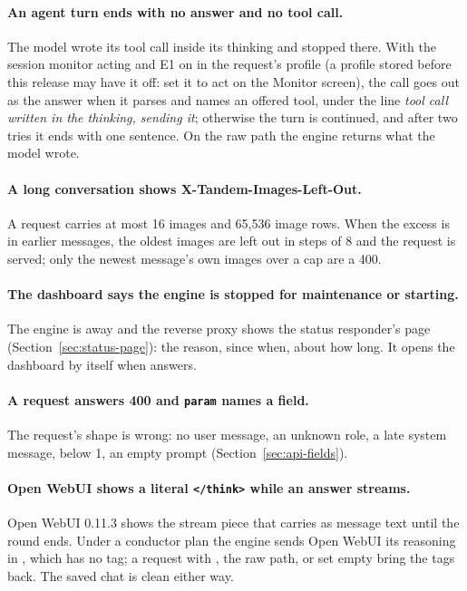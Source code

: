 \paragraph{An agent turn ends with no answer and no tool call.} The model wrote its tool call inside its thinking and stopped there. With the session monitor acting and E1 on in the request's profile (a profile stored before this release may have it off: set it to act on the Monitor screen), the call goes out as the answer when it parses and names an offered tool, under the line \emph{tool call written in the thinking, sending it}; otherwise the turn is continued, and after two tries it ends with one sentence. On the raw path the engine returns what the model wrote.

\paragraph{A long conversation shows X-Tandem-Images-Left-Out.} A request carries at most 16 images and 65,536 image rows. When the excess is in earlier messages, the oldest images are left out in steps of 8 and the request is served; only the newest message's own images over a cap are a 400.

\paragraph{The dashboard says the engine is stopped for maintenance or starting.} The engine is away and the reverse proxy shows the status responder's page (Section~\ref{sec:status-page}): the reason, since when, about how long. It opens the dashboard by itself when  answers.

\paragraph{A request answers 400 and \texttt{param} names a field.} The request's shape is wrong: no user message, an unknown role, a late system message,  below 1, an empty prompt (Section~\ref{sec:api-fields}).

\paragraph{Open WebUI shows a literal \texttt{</think>} while an answer streams.} Open WebUI 0.11.3 shows the stream piece that carries  as message text until the round ends. Under a conductor plan the engine sends Open WebUI its reasoning in , which has no tag; a request with , the raw path, or  set empty bring the tags back. The saved chat is clean either way.

